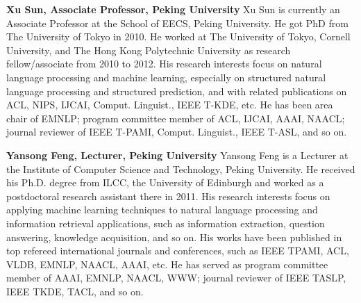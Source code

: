 \clearpage{}







\begin{bio}
\textbf{ Xu Sun, Associate Professor, Peking University} 
 Xu Sun is currently an Associate Professor at the School of EECS, Peking University. He got PhD from The University of Tokyo in 2010. He worked at The University of Tokyo, Cornell University, and The Hong Kong Polytechnic University as research fellow/associate from 2010 to 2012. His research interests focus on natural language processing and machine learning, especially on structured natural language processing and structured prediction, and with related publications on ACL, NIPS, IJCAI, Comput. Linguist., IEEE T-KDE, etc. He has been area chair of EMNLP; program committee member of ACL, IJCAI, AAAI, NAACL; journal reviewer of IEEE T-PAMI, Comput. Linguist., IEEE T-ASL, and so on.

\textbf{Yansong Feng, Lecturer, Peking University}
 Yansong Feng is a Lecturer at the Institute of Computer Science and Technology, Peking University. He received his Ph.D. degree from ILCC, the University of Edinburgh and worked as a postdoctoral research assistant there in 2011. His research interests focus on applying machine learning techniques to natural language processing and information retrieval applications, such as information extraction, question answering, knowledge acquisition, and so on. His works have been published in top refereed international journals and conferences, such as IEEE TPAMI, ACL, VLDB, EMNLP, NAACL, AAAI, etc. He has served as program committee member of AAAI, EMNLP, NAACL, WWW; journal reviewer of IEEE TASLP, IEEE TKDE, TACL, and so on. 
  
\end{bio}
